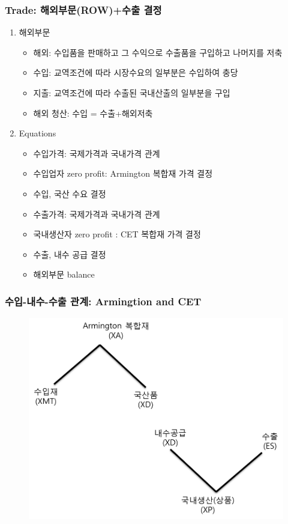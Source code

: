 \documentclass[10pt,compress,slidetop,%
			   hyperref={unicode},xcolor={svgnames},%
			   t]{beamer}
\begin{document}
\begin{frame}
	\frametitle{Trade: 해외부문(ROW)+수출 결정}
\bigskip
\begin{enumerate}
\item{해외부문}
		\begin{itemize}
		\item{해외: 수입품을 판매하고 그 수익으로 수출품을 구입하고 나머지를 저축}
		\item{수입: 교역조건에 따라 시장수요의 일부분은 수입하여 충당}
		\item{지출: 교역조건에 따라 수출된 국내산출의 일부분을 구입}
		\item{해외 청산: 수입 = 수출+해외저축} 
		\end{itemize}
\bigskip		
\item{Equations}
		\begin{itemize}
		\item{수입가격: 국제가격과 국내가격 관계}
		\item{수입업자 zero profit: Armington 복합재 가격 결정}
		\item{수입, 국산 수요 결정}
		\item{수출가격: 국제가격과 국내가격 관계}
		\item{국내생산자 zero profit : CET 복합재 가격 결정}
		\item{수출, 내수 공급 결정}
		\item{해외부문 balance}
		\end{itemize}
\end{enumerate}
	
\end{frame}
\begin{frame}
	\frametitle{수입-내수-수출 관계: Armingtion and CET}
		  	\begin{figure}
	\centering
	 \includegraphics[width=1.00\textwidth]{imex.png}
	\end{figure}	
\end{frame}
\end{document}
